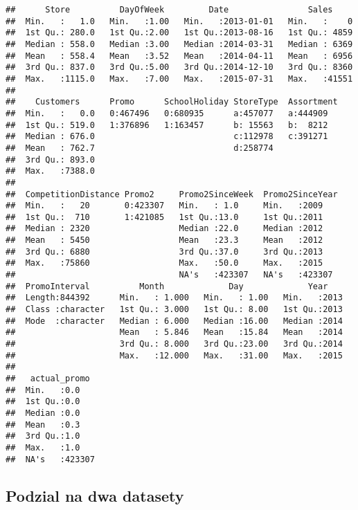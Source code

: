 \documentclass[]{article}
\begin{document}
\begin{verbatim}
##      Store          DayOfWeek         Date                Sales      
##  Min.   :   1.0   Min.   :1.00   Min.   :2013-01-01   Min.   :    0  
##  1st Qu.: 280.0   1st Qu.:2.00   1st Qu.:2013-08-16   1st Qu.: 4859  
##  Median : 558.0   Median :3.00   Median :2014-03-31   Median : 6369  
##  Mean   : 558.4   Mean   :3.52   Mean   :2014-04-11   Mean   : 6956  
##  3rd Qu.: 837.0   3rd Qu.:5.00   3rd Qu.:2014-12-10   3rd Qu.: 8360  
##  Max.   :1115.0   Max.   :7.00   Max.   :2015-07-31   Max.   :41551  
##                                                                      
##    Customers      Promo      SchoolHoliday StoreType  Assortment
##  Min.   :   0.0   0:467496   0:680935      a:457077   a:444909  
##  1st Qu.: 519.0   1:376896   1:163457      b: 15563   b:  8212  
##  Median : 676.0                            c:112978   c:391271  
##  Mean   : 762.7                            d:258774             
##  3rd Qu.: 893.0                                                 
##  Max.   :7388.0                                                 
##                                                                 
##  CompetitionDistance Promo2     Promo2SinceWeek  Promo2SinceYear 
##  Min.   :   20       0:423307   Min.   : 1.0     Min.   :2009    
##  1st Qu.:  710       1:421085   1st Qu.:13.0     1st Qu.:2011    
##  Median : 2320                  Median :22.0     Median :2012    
##  Mean   : 5450                  Mean   :23.3     Mean   :2012    
##  3rd Qu.: 6880                  3rd Qu.:37.0     3rd Qu.:2013    
##  Max.   :75860                  Max.   :50.0     Max.   :2015    
##                                 NA's   :423307   NA's   :423307  
##  PromoInterval          Month             Day             Year     
##  Length:844392      Min.   : 1.000   Min.   : 1.00   Min.   :2013  
##  Class :character   1st Qu.: 3.000   1st Qu.: 8.00   1st Qu.:2013  
##  Mode  :character   Median : 6.000   Median :16.00   Median :2014  
##                     Mean   : 5.846   Mean   :15.84   Mean   :2014  
##                     3rd Qu.: 8.000   3rd Qu.:23.00   3rd Qu.:2014  
##                     Max.   :12.000   Max.   :31.00   Max.   :2015  
##                                                                    
##   actual_promo   
##  Min.   :0.0     
##  1st Qu.:0.0     
##  Median :0.0     
##  Mean   :0.3     
##  3rd Qu.:1.0     
##  Max.   :1.0     
##  NA's   :423307
\end{verbatim}

\hypertarget{podzial-na-dwa-datasety}{%
\subsection{Podzial na dwa datasety}\label{podzial-na-dwa-datasety}}
\end{document}

